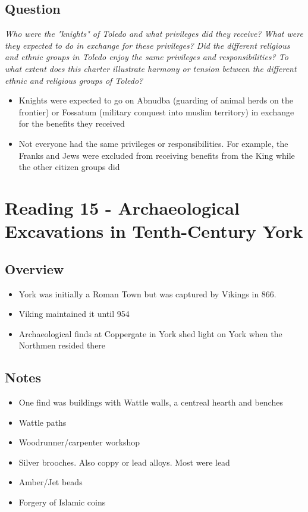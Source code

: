 \documentclass[12pt]{article}
\begin{document}
{\subsection*{Question}

\textit{Who were the "knights" of Toledo and what privileges did they receive? What were they expected to do in exchange for these privileges? Did the different religious and ethnic groups in Toledo enjoy the same privileges and responsibilities? To what extent does this charter illustrate harmony or tension between the different ethnic and religious groups of Toledo?}

\begin{itemize}
	\item Knights were expected to go on Abnudba (guarding of animal herds on the frontier) or Fossatum (military conquest into muslim territory) in exchange for the benefits they received
	\item Not everyone had the same privileges or responsibilities. For example, the Franks and Jews were excluded from receiving benefits from the King while the other citizen groups did
\end{itemize}


\section*{Reading 15 - Archaeological Excavations in Tenth-Century York}

\subsection*{Overview}
\begin{itemize}
	\item York was initially a Roman Town but was captured by Vikings in 866.
	\item Viking maintained it until 954
	\item Archaeological finds at Coppergate in York shed light on York when the Northmen resided there
\end{itemize}

\subsection*{Notes}
\begin{itemize}
	\item One find was buildings with Wattle walls, a centreal hearth and benches
	\item Wattle paths
	\item Woodrunner/carpenter workshop
	\item Silver brooches. Also coppy or lead alloys. Most were lead
	\item Amber/Jet beads
	\item Forgery of Islamic coins
\end{itemize}

}
\end{document}
